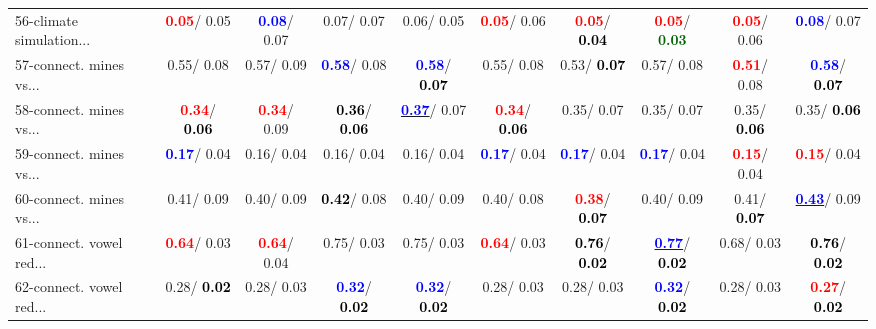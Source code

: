 \begin{table}[h]
\begin{center}
{\begin{tabular}{lc|c|c|c|c|c|c|c|c}
56-climate simulation... & \textcolor{red}{\textbf{  0.05}}/  0.05 & \textcolor{blue}{\textbf{  0.08}}/  0.07 &   0.07/  0.07 &   0.06/  0.05 & \textcolor{red}{\textbf{  0.05}}/  0.06 & \textcolor{red}{\textbf{  0.05}}/\textcolor{black}{\textbf{  0.04}} & \textcolor{red}{\textbf{  0.05}}/\textcolor{darkgreen}{\textbf{  0.03}} & \textcolor{red}{\textbf{  0.05}}/  0.06 & \textcolor{blue}{\textbf{  0.08}}/  0.07 \\
57-connect. mines vs... &   0.55/  0.08 &   0.57/  0.09 & \textcolor{blue}{\textbf{  0.58}}/  0.08 & \textcolor{blue}{\textbf{  0.58}}/\textcolor{black}{\textbf{  0.07}} &   0.55/  0.08 &   0.53/\textcolor{black}{\textbf{  0.07}} &   0.57/  0.08 & \textcolor{red}{\textbf{  0.51}}/  0.08 & \textcolor{blue}{\textbf{  0.58}}/\textcolor{black}{\textbf{  0.07}} \\
58-connect. mines vs... & \textcolor{red}{\textbf{  0.34}}/\textcolor{black}{\textbf{  0.06}} & \textcolor{red}{\textbf{  0.34}}/  0.09 & \textcolor{black}{\textbf{  0.36}}/\textcolor{black}{\textbf{  0.06}} & \underline{\textcolor{blue}{\textbf{  0.37}}}/  0.07 & \textcolor{red}{\textbf{  0.34}}/\textcolor{black}{\textbf{  0.06}} &   0.35/  0.07 &   0.35/  0.07 &   0.35/\textcolor{black}{\textbf{  0.06}} &   0.35/\textcolor{black}{\textbf{  0.06}} \\
59-connect. mines vs... & \textcolor{blue}{\textbf{  0.17}}/  0.04 &   0.16/  0.04 &   0.16/  0.04 &   0.16/  0.04 & \textcolor{blue}{\textbf{  0.17}}/  0.04 & \textcolor{blue}{\textbf{  0.17}}/  0.04 & \textcolor{blue}{\textbf{  0.17}}/  0.04 & \textcolor{red}{\textbf{  0.15}}/  0.04 & \textcolor{red}{\textbf{  0.15}}/  0.04 \\
60-connect. mines vs... &   0.41/  0.09 &   0.40/  0.09 & \textcolor{black}{\textbf{  0.42}}/  0.08 &   0.40/  0.09 &   0.40/  0.08 & \textcolor{red}{\textbf{  0.38}}/\textcolor{black}{\textbf{  0.07}} &   0.40/  0.09 &   0.41/\textcolor{black}{\textbf{  0.07}} & \underline{\textcolor{blue}{\textbf{  0.43}}}/  0.09 \\ \hline
61-connect. vowel red... & \textcolor{red}{\textbf{  0.64}}/  0.03 & \textcolor{red}{\textbf{  0.64}}/  0.04 &   0.75/  0.03 &   0.75/  0.03 & \textcolor{red}{\textbf{  0.64}}/  0.03 & \textcolor{black}{\textbf{  0.76}}/\textcolor{black}{\textbf{  0.02}} & \underline{\textcolor{blue}{\textbf{  0.77}}}/\textcolor{black}{\textbf{  0.02}} &   0.68/  0.03 & \textcolor{black}{\textbf{  0.76}}/\textcolor{black}{\textbf{  0.02}} \\
62-connect. vowel red... &   0.28/\textcolor{black}{\textbf{  0.02}} &   0.28/  0.03 & \textcolor{blue}{\textbf{  0.32}}/\textcolor{black}{\textbf{  0.02}} & \textcolor{blue}{\textbf{  0.32}}/\textcolor{black}{\textbf{  0.02}} &   0.28/  0.03 &   0.28/  0.03 & \textcolor{blue}{\textbf{  0.32}}/\textcolor{black}{\textbf{  0.02}} &   0.28/  0.03 & \textcolor{red}{\textbf{  0.27}}/\textcolor{black}{\textbf{  0.02}} \\

\end{tabular}}
\end{center}
\end{table}
